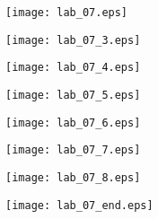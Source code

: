 \documentclass[a4paper,12pt]{article} %
\begin{document}
\newpage


\begin{figure}[h!]
\centering
\texttt{[image: lab\_07.eps]}
\end{figure}


\newpage


\begin{figure}[h!]
\centering
\texttt{[image: lab\_07\_3.eps]}
\end{figure}

\begin{figure}[h!]
\centering
\texttt{[image: lab\_07\_4.eps]}
\end{figure}

\begin{figure}[h!]
\centering
\texttt{[image: lab\_07\_5.eps]}
\end{figure}

\begin{figure}[h!]
\centering
\texttt{[image: lab\_07\_6.eps]}
\end{figure}

\begin{figure}[h!]
\centering
\texttt{[image: lab\_07\_7.eps]}
\end{figure}

\begin{figure}[h!]
\centering
\texttt{[image: lab\_07\_8.eps]}
\end{figure}

\begin{figure}[h!]
\centering
\texttt{[image: lab\_07\_end.eps]}
\end{figure}
\end{document}
